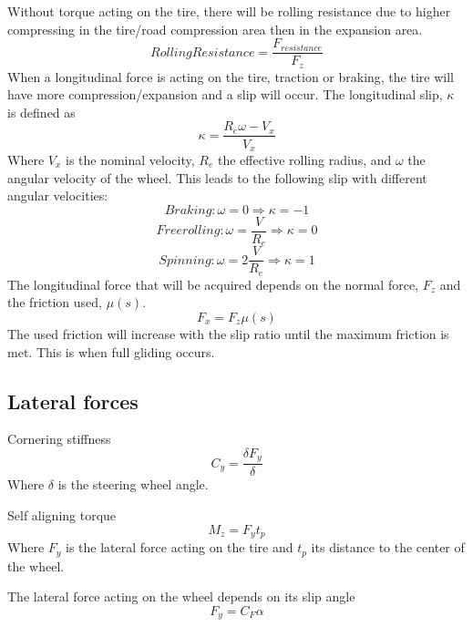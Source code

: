 Without torque acting on the tire, there will be rolling resistance due to higher compressing in the tire/road compression area then in the expansion area.
\begin{equation}
 	RollingResistance = \frac{F_{resistance}}{F_{z}}
\end{equation}
When a longitudinal force is acting on the tire, traction or braking, the tire will have more compression/expansion and a slip will occur. The longitudinal slip, $ \kappa $ is defined as
\begin{equation}
	 \kappa = \dfrac{R_{e}\omega-V_{x}}{V_{x}}
\end{equation}
Where $V_{x}$ is the nominal velocity, $R_{e}$ the effective rolling radius, and $\omega$ the angular velocity of the wheel. This leads to the following slip with different angular velocities:
\begin{equation}
	Braking: \omega = 0 \Rightarrow \kappa = -1
\end{equation}
\begin{equation}
	Free rolling: \omega = \frac{V}{R_{e}} \Rightarrow \kappa = 0
\end{equation}
\begin{equation}
	Spinning: \omega = 2\frac{V}{R_{e}} \Rightarrow \kappa = 1
\end{equation}
The longitudinal force that will be acquired depends on the normal force, $ F_{z} $ and the friction used, $ \mu(s) $.
\begin{equation}
	 F_{x} = F_{z}\mu(s)
\end{equation}
The used friction will increase with the slip ratio until the maximum friction is met. This is when full gliding occurs. 

\subsection{Lateral forces}

Cornering stiffness
\begin{equation}
	C_{y} = \frac{\delta F_{y}}{\delta}
\end{equation}
Where $\delta$ is the steering wheel angle.

Self aligning torque
\begin{equation}
	M_{z} = F_{y}t_{p}
\end{equation}
Where $ F_{y} $  is the lateral force acting on the tire and $ t_{p} $ its distance to the center of the wheel. 

The lateral force acting on the wheel depends on its slip angle
\begin{equation}
	F_{y}=C_{F}\alpha
\end{equation}

